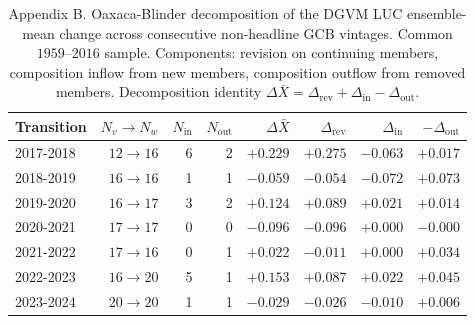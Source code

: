 \begin{table}[h]
  \centering
  \caption{Appendix B. Oaxaca-Blinder decomposition of the DGVM LUC ensemble-mean change across consecutive non-headline GCB vintages. Common $1959$--$2016$ sample. Components: revision on continuing members, composition inflow from new members, composition outflow from removed members. Decomposition identity $\Delta \bar X = \Delta_{\mathrm{rev}} + \Delta_{\mathrm{in}} - \Delta_{\mathrm{out}}$.}
  \label{tab:appB_dgvm_luc}
  \begin{tabular}{lrrrrrrr}
    \toprule
    Transition & $N_v\!\to\! N_w$ & $N_{\mathrm{in}}$ & $N_{\mathrm{out}}$ & $\Delta \bar X$ & $\Delta_{\mathrm{rev}}$ & $\Delta_{\mathrm{in}}$ & $-\Delta_{\mathrm{out}}$ \\
    \midrule
    2017-2018 & $12\!\to\!16$ & 6 & 2 & $+0.229$ & $+0.275$ & $-0.063$ & $+0.017$ \\
    2018-2019 & $16\!\to\!16$ & 1 & 1 & $-0.059$ & $-0.054$ & $-0.072$ & $+0.073$ \\
    2019-2020 & $16\!\to\!17$ & 3 & 2 & $+0.124$ & $+0.089$ & $+0.021$ & $+0.014$ \\
    2020-2021 & $17\!\to\!17$ & 0 & 0 & $-0.096$ & $-0.096$ & $+0.000$ & $-0.000$ \\
    2021-2022 & $17\!\to\!16$ & 0 & 1 & $+0.022$ & $-0.011$ & $+0.000$ & $+0.034$ \\
    2022-2023 & $16\!\to\!20$ & 5 & 1 & $+0.153$ & $+0.087$ & $+0.022$ & $+0.045$ \\
    2023-2024 & $20\!\to\!20$ & 1 & 1 & $-0.029$ & $-0.026$ & $-0.010$ & $+0.006$ \\
    \bottomrule
  \end{tabular}
\end{table}

